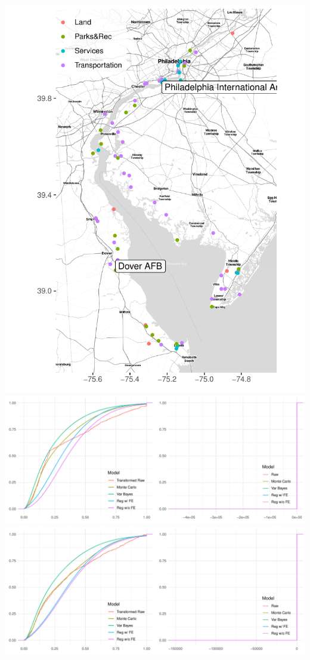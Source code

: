 \includegraphics{./plots/delaware}
\includegraphics{./plots/delaware_marginal_dover_afb}
\includegraphics{./plots/delaware_marginal_phil_ia}

